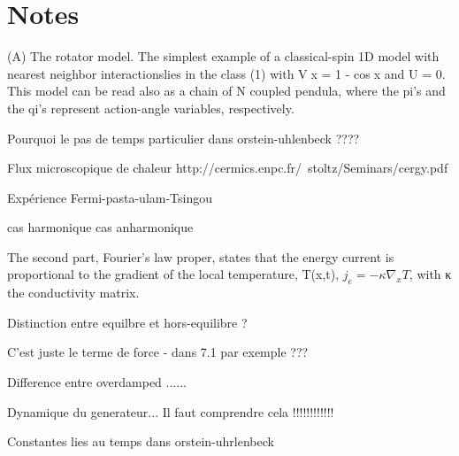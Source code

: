 \section{Notes}

(A) The rotator model. The simplest example of a classical-spin 1D
model with nearest neighbor interactionslies in the class (1) with
Vx = 1 - cosx and U = 0.
This model can be read also as a chain of N coupled pendula, where the pi's
and the qi's represent action-angle variables, respectively.

Pourquoi le pas de temps particulier dans orstein-uhlenbeck ????

Flux microscopique de chaleur
http://cermics.enpc.fr/~stoltz/Seminars/cergy.pdf

Expérience Fermi-pasta-ulam-Tsingou

cas harmonique
cas anharmonique

The second part, Fourier’s law proper, states that the energy current
is proportional to the gradient of the local temperature, T(x,t),
$j_e = -κ \nabla_x T$, with κ the conductivity matrix.

Distinction entre equilbre et hors-equilibre ?

C'est juste le terme de force - dans 7.1 par exemple ???

Difference entre overdamped ......

Dynamique du generateur... Il faut comprendre cela !!!!!!!!!!!!

Constantes lies au temps dans orstein-uhrlenbeck